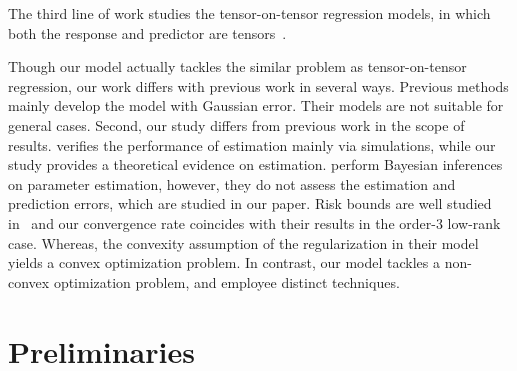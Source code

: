\documentclass[12pt]{article}
\theoremstyle{plain}
\theoremstyle{definition}
\begin{document}
The third line of work studies the tensor-on-tensor regression models, in which both the response and predictor are tensors~\citep{raskutti2015convex, lock2018tensor, gahrooei2020multiple}. 



Though our model actually tackles the similar problem as tensor-on-tensor regression, our work differs with previous work in several ways. Previous methods mainly develop the model with Gaussian error. Their models are not suitable for general cases. Second, our study differs from previous work in the scope of results. \citep{gahrooei2020multiple} verifies the performance of estimation mainly via simulations, while our study provides a theoretical evidence on estimation. \citep{lock2018tensor} perform Bayesian inferences on parameter estimation, however, they do not assess the estimation and prediction errors, which are studied in our paper. Risk bounds are well studied in~\citep{raskutti2015convex} and our convergence rate coincides with their results in the order-3 low-rank case. Whereas, the convexity assumption of the regularization in their model yields a convex optimization problem. In contrast,  our model tackles a non-convex optimization problem, and employee distinct techniques. 



\section{Preliminaries}
\end{document}
